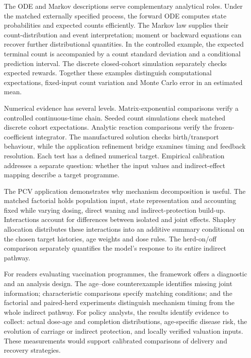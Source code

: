 \documentclass[10pt,letterpaper]{article}
\begin{document}
The ODE and Markov descriptions serve complementary analytical roles. Under the matched externally specified process, the forward ODE computes state probabilities and expected counts efficiently. The Markov law supplies their count-distribution and event interpretation; moment or backward equations can recover further distributional quantities. In the controlled example, the expected terminal count is accompanied by a count standard deviation and a conditional prediction interval. The discrete closed-cohort simulation separately checks expected rewards. Together these examples distinguish computational expectations, fixed-input count variation and Monte Carlo error in an estimated mean.

Numerical evidence has several levels. Matrix-exponential comparisons verify a controlled continuous-time chain. Seeded count simulations check matched discrete cohort expectations. Analytic reaction comparisons verify the frozen-coefficient integrator. The manufactured solution checks birth/transport behaviour, while the application refinement bridge examines timing and feedback resolution. Each test has a defined numerical target. Empirical calibration addresses a separate question: whether the input values and indirect-effect mapping describe a target programme.

The PCV application demonstrates why mechanism decomposition is useful. The matched factorial holds population input, state representation and accounting fixed while varying dosing, direct waning and indirect-protection build-up. Interactions account for differences between isolated and joint effects. Shapley allocation distributes these interactions into an additive summary conditional on the chosen target histories, age weights and dose rules. The herd-on/off comparison separately quantifies the model's response to its entire indirect pathway.

For readers evaluating vaccination programmes, the framework offers a diagnostic and an analysis design. The age--dose counterexample identifies missing joint information; characteristic comparisons specify matching conditions; and the factorial and paired-herd experiments distinguish mechanism timing from the whole indirect pathway. For policy analysts, the results identify evidence to collect: actual dose-age and completion distributions, age-specific disease risk, the evolution of carriage or indirect protection, and locally verified valuation inputs. These measurements would support calibrated comparisons of delivery and recovery strategies.
\end{document}
